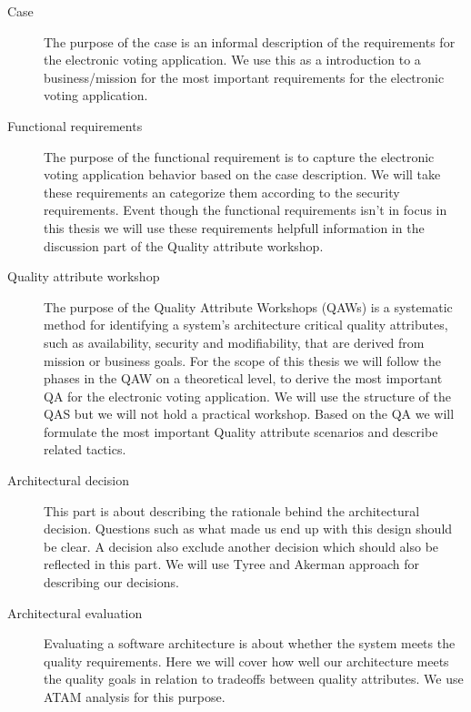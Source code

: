\begin{description}
    \item[Case] The purpose of the case is an informal description of the requirements for the electronic voting application. We use this as a introduction to a business/mission for the most important requirements for the electronic voting application.
    
    
    \item[Functional requirements]  The purpose of the functional requirement is to capture the electronic voting application behavior based on the case description. We will take these requirements an categorize them according to the security requirements. Event though the functional requirements isn't in focus in this thesis we will use these requirements helpfull information in the discussion part of the Quality attribute workshop.  
    
    \item[Quality attribute workshop]  The purpose of the Quality Attribute Workshops (QAWs) is a systematic method for identifying a system's architecture critical quality attributes, such as availability, security and modifiability, that are derived from mission or business goals. For the scope of this thesis we will follow the phases in the QAW on a theoretical level, to derive the most important QA for the electronic voting application. We will use the structure of the QAS but we will not hold a practical workshop.  Based on the QA we will formulate the most important Quality attribute scenarios and describe related tactics.
    
    \item[Architectural decision]  This part is about describing the rationale behind the architectural decision. Questions such as what made us end up with this design should be clear. A decision also exclude another decision which should also be reflected in this part. We will use Tyree and Akerman approach for describing our decisions. 
    
    \item[Architectural evaluation]  Evaluating a software architecture is about whether the system meets the quality requirements. Here we will cover how well our architecture meets the quality goals in relation to tradeoffs between quality attributes. We use ATAM analysis for this purpose.  

\end{description}